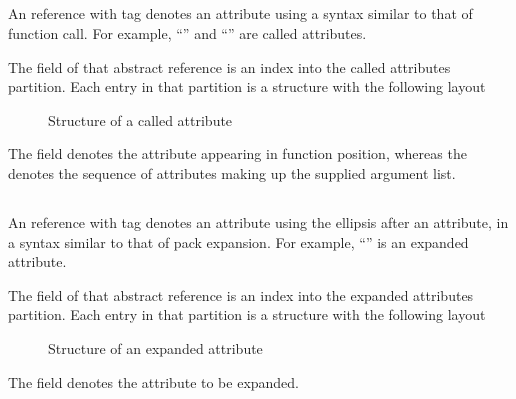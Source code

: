 
\subsection{}
\label{sec:ifc:AttrSort:Called}

An  reference with tag  denotes an attribute using a syntax similar to that of function call.  For example,
``'' and ``'' are called attributes.

The  field of that abstract reference is an index into the called attributes partition.  Each entry in
that partition is a structure with the following layout
%
\begin{figure}[H]
    \centering
    \caption{Structure of a called attribute}
    \label{fig:ifc:AttrSort:Called}
\end{figure}
%
The  field denotes the attribute appearing in function position, whereas the  denotes
the sequence of attributes making up the supplied argument list.


\subsection{}
\label{sec:ifc:AttrSort:Expanded}

An  reference with tag  denotes an attribute using the ellipsis after an attribute, in a syntax similar to that of pack expansion.
For example, ``'' is an expanded attribute.

The  field of that abstract reference is an index into the expanded attributes partition.
Each entry in that partition is a structure with the following layout
%
\begin{figure}[H]
    \centering
    \caption{Structure of an expanded attribute}
\end{figure}
%
The  field denotes the attribute to be expanded.

